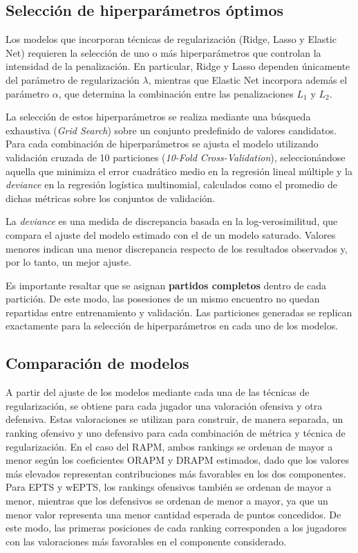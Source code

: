 \documentclass[
  12pt,
]{article}
\begin{document}
\subsection{Selección de hiperparámetros
óptimos}\label{selecciuxf3n-de-hiperparuxe1metros-uxf3ptimos}

Los modelos que incorporan técnicas de regularización (Ridge, Lasso y
Elastic Net) requieren la selección de uno o más hiperparámetros que
controlan la intensidad de la penalización. En particular, Ridge y Lasso
dependen únicamente del parámetro de regularización \(\lambda\),
mientras que Elastic Net incorpora además el parámetro \(\alpha\), que
determina la combinación entre las penalizaciones \(L_1\) y \(L_2\).

La selección de estos hiperparámetros se realiza mediante una búsqueda
exhaustiva (\emph{Grid Search}) sobre un conjunto predefinido de valores
candidatos. Para cada combinación de hiperparámetros se ajusta el modelo
utilizando validación cruzada de 10 particiones (\emph{10-Fold
Cross-Validation}), seleccionándose aquella que minimiza el error
cuadrático medio en la regresión lineal múltiple y la \emph{deviance} en
la regresión logística multinomial, calculados como el promedio de
dichas métricas sobre los conjuntos de validación.

La \emph{deviance} es una medida de discrepancia basada en la
log-verosimilitud, que compara el ajuste del modelo estimado con el de
un modelo saturado. Valores menores indican una menor discrepancia
respecto de los resultados observados y, por lo tanto, un mejor ajuste.

Es importante resaltar que se asignan \textbf{partidos completos} dentro
de cada partición. De este modo, las posesiones de un mismo encuentro no
quedan repartidas entre entrenamiento y validación. Las particiones
generadas se replican exactamente para la selección de hiperparámetros
en cada uno de los modelos.

\subsection{Comparación de modelos}\label{comparaciuxf3n-de-modelos}

A partir del ajuste de los modelos mediante cada una de las técnicas de
regularización, se obtiene para cada jugador una valoración ofensiva y
otra defensiva. Estas valoraciones se utilizan para construir, de manera
separada, un ranking ofensivo y uno defensivo para cada combinación de
métrica y técnica de regularización. En el caso del RAPM, ambos rankings
se ordenan de mayor a menor según los coeficientes ORAPM y DRAPM
estimados, dado que los valores más elevados representan contribuciones
más favorables en los dos componentes. Para EPTS y wEPTS, los rankings
ofensivos también se ordenan de mayor a menor, mientras que los
defensivos se ordenan de menor a mayor, ya que un menor valor representa
una menor cantidad esperada de puntos concedidos. De este modo, las
primeras posiciones de cada ranking corresponden a los jugadores con las
valoraciones más favorables en el componente considerado.
\end{document}
